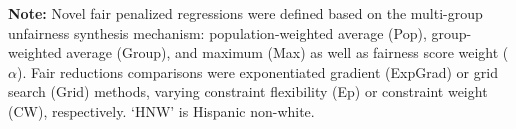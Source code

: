 \documentclass[
  12pt]{article}
\begin{document}
\begin{table}
{ \begin{flushleft} \small{\textbf{Note:} Novel fair penalized regressions were defined based on the multi-group unfairness synthesis mechanism: population-weighted average (Pop), group-weighted average (Group), and maximum (Max) as well as fairness score weight ($\alpha$). Fair reductions comparisons were exponentiated gradient (ExpGrad) or grid search (Grid) methods, varying constraint flexibility (Ep) or constraint weight (CW), respectively. `HNW' is Hispanic non-white.} \end{flushleft}

}

\end{table}%
\end{document}
